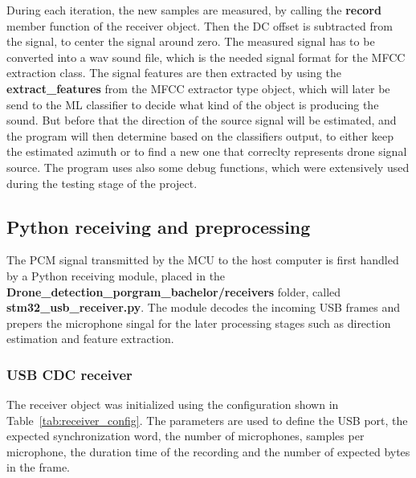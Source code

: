 During each iteration, the new samples are measured, by calling the \textbf{record} member function of the receiver object. Then the DC offset is subtracted from the signal, to center the signal around zero. The measured signal has to be converted into a wav sound file, which is the needed signal format for the MFCC extraction class. The signal features are then extracted by using the \textbf{extract\_features} from the MFCC extractor type object, which will later be send to the ML classifier to decide what kind of the object is producing the sound. But before that the direction of the source signal will be estimated, and the program will then determine based on the classifiers output, to either keep the estimated azimuth or to find a new one that correclty represents drone signal source. The program uses also some debug functions, which were extensively used during the testing stage of the project.  


\subsection{Python receiving and preprocessing}
The PCM signal transmitted by the MCU to the host computer is first handled by a Python receiving module, placed in the \textbf{Drone\_detection\_porgram\_bachelor/receivers} folder, called \textbf{stm32\_usb\_receiver.py}. The module decodes the incoming USB frames and prepers the microphone singal for the later processing stages such as direction estimation and feature extraction. 

    \subsubsection{USB CDC receiver}
    The receiver object was initialized using the configuration shown in Table~\ref{tab:receiver_config}. The parameters are used to define the USB port, the expected synchronization word, the number of microphones, samples per microphone, the duration time of the recording and the number of expected bytes in the frame.

